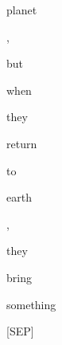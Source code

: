 \documentclass[varwidth=150mm]{standalone}
\begin{document}
\begin{CJK*}{UTF8}{gbsn}
{{{\colorbox{red!26.187955856323242}{\strut planet} \colorbox{red!0.0}{\strut ,} \colorbox{red!12.878851890563965}{\strut but} \colorbox{red!0.0}{\strut when} \colorbox{red!4.0237202644348145}{\strut they} \colorbox{red!0.0}{\strut return} \colorbox{red!0.0}{\strut to} \colorbox{red!39.2674674987793}{\strut earth} \colorbox{red!0.0}{\strut ,} \colorbox{red!7.896847248077393}{\strut they} \colorbox{red!1.8833845853805542}{\strut bring} \colorbox{red!32.24732971191406}{\strut something} \colorbox{red!11.242600440979004}{\strut [SEP]}
}}}
\end{CJK*}
\end{document}
